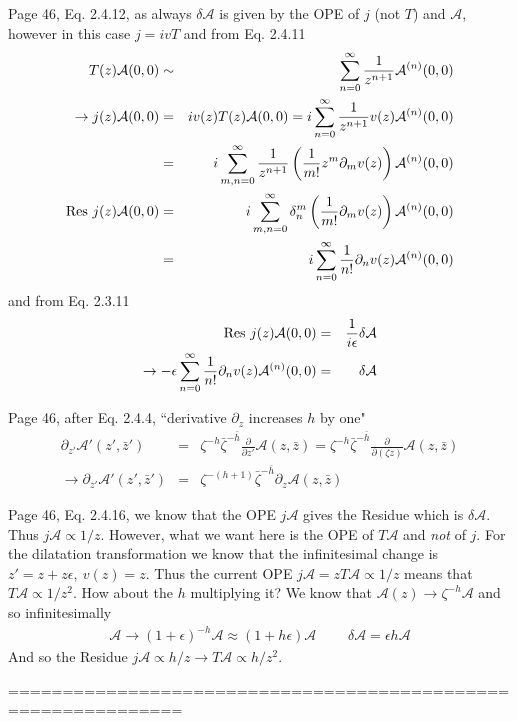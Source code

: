 \documentclass[aps,preprint,preprintnumbers,nofootinbib,showpacs,prd]{revtex4-1}
\newcommand{\nbea}{\begin{eqnarray*}}
\newcommand{\neea}{\end{eqnarray*}}
\begin{document}
Page 46, Eq. 2.4.12, as always $\delta \mathcal{A}$ is given by the OPE of $j$ (not $T$) and $\mathcal{A}$, however in this case $j = i v T$ and from Eq. 2.4.11
%
\nbea
T(z) \mathcal{A}(0,0) & \sim & \sum_{n=0}^\infty \frac{1}{z^{n+1}} \mathcal{A}^{(n)}(0,0) \\
\rightarrow j(z) \mathcal{A}(0,0) & = & i v(z) T(z) \mathcal{A}(0,0) = i \sum_{n=0}^\infty \frac{1}{z^{n+1}} v(z) \mathcal{A}^{(n)}(0,0) \\
& = & i \sum_{m, n=0}^\infty \frac{1}{z^{n+1}} \left (\frac{1}{m!} z^m \partial_m v(z) \right ) \mathcal{A}^{(n)}(0,0) \\
{\rm Res~} j(z) \mathcal{A}(0,0) & = & i \sum_{m, n=0}^\infty \delta^m_{n} \left (\frac{1}{m!} \partial_m v(z) \right ) \mathcal{A}^{(n)}(0,0) \\
& = & i \sum_{n=0}^\infty \frac{1}{n!} \partial_n v(z) \mathcal{A}^{(n)}(0,0)
\neea
%
and from Eq. 2.3.11
%
\nbea
{\rm Res~} j(z) \mathcal{A}(0,0) & = & \frac{1}{i \epsilon} \delta \mathcal{A} \\
\rightarrow -\epsilon \sum_{n=0}^\infty \frac{1}{n!} \partial_n v(z) \mathcal{A}^{(n)}(0,0) & = & \delta \mathcal{A}
\neea
%

Page 46, after Eq. 2.4.4, ``derivative $\partial_z$ increases $h$ by one"
%
\nbea
\partial_{z'}\mathcal{A'}(z', \bar z') & = & \zeta^{-h} \bar \zeta^{-\bar h}\frac{\partial}{\partial z'} \mathcal{A}(z, \bar z)= \zeta^{-h} \bar \zeta^{-\bar h}\frac{\partial}{\partial (\zeta z)}  \mathcal{A}(z, \bar z) \\
\rightarrow \partial_{z'}\mathcal{A'}(z', \bar z')  & = & \zeta^{-(h+1)} \bar \zeta^{-\bar h} \partial_z \mathcal{A}(z, \bar z)
\neea
%

Page 46, Eq. 2.4.16, we know that the OPE $j\mathcal{A}$ gives the Residue which is $\delta\mathcal{A}$. Thus $j\mathcal{A} \propto 1/z$. However, what we want here is the OPE of $T\mathcal{A}$ and {\it not} of $j$. For the dilatation transformation we know that the infinitesimal change is $z' = z + z\epsilon,~v(z) = z$. Thus the current OPE $j \mathcal{A} = z T \mathcal{A} \propto 1/z$ means that $T \mathcal{A} \propto 1/z^2$. How about the $h$ multiplying it? We know that $\mathcal{A}(z) \rightarrow \zeta^{-h} \mathcal{A}$ and so infinitesimally
%
\nbea
\mathcal{A} \rightarrow (1 + \epsilon)^{-h} \mathcal{A} \approx (1 + h\epsilon) \mathcal{A} & ~~~ & \delta \mathcal{A} = \epsilon h \mathcal{A}
\neea
%
And so the Residue $j \mathcal{A} \propto h/z \rightarrow T \mathcal{A} \propto h/z^2$.


==============================================================
\end{document}
